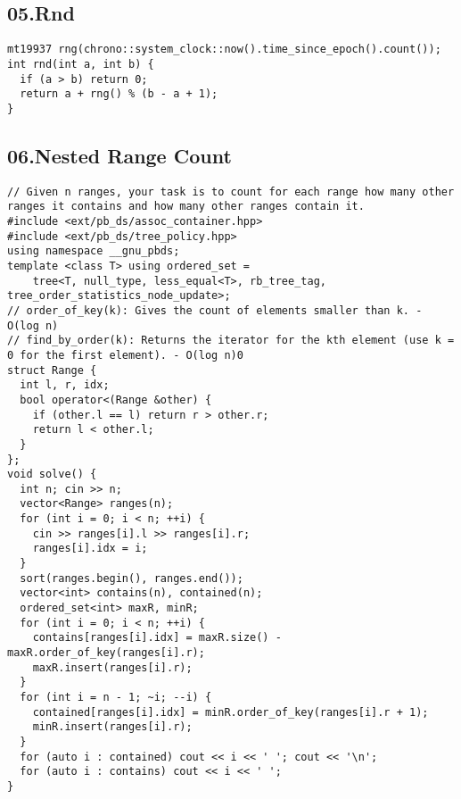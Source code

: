 \documentclass[twoside]{article}
\begin{document}
\begin{multicols*}{2}
{
\subsection*{05.Rnd}
}
\begin{verbatim}
mt19937 rng(chrono::system_clock::now().time_since_epoch().count());
int rnd(int a, int b) {
  if (a > b) return 0;
  return a + rng() % (b - a + 1);
}
\end{verbatim}

{
\subsection*{06.Nested Range Count}
}
\begin{verbatim}
// Given n ranges, your task is to count for each range how many other ranges it contains and how many other ranges contain it.
#include <ext/pb_ds/assoc_container.hpp>
#include <ext/pb_ds/tree_policy.hpp>
using namespace __gnu_pbds;
template <class T> using ordered_set =
    tree<T, null_type, less_equal<T>, rb_tree_tag, tree_order_statistics_node_update>;
// order_of_key(k): Gives the count of elements smaller than k. - O(log n)
// find_by_order(k): Returns the iterator for the kth element (use k = 0 for the first element). - O(log n)0
struct Range {
  int l, r, idx;
  bool operator<(Range &other) {
    if (other.l == l) return r > other.r;
    return l < other.l;
  }
};
void solve() {
  int n; cin >> n;
  vector<Range> ranges(n);
  for (int i = 0; i < n; ++i) {
    cin >> ranges[i].l >> ranges[i].r;
    ranges[i].idx = i;
  }
  sort(ranges.begin(), ranges.end());
  vector<int> contains(n), contained(n);
  ordered_set<int> maxR, minR;
  for (int i = 0; i < n; ++i) {
    contains[ranges[i].idx] = maxR.size() - maxR.order_of_key(ranges[i].r);
    maxR.insert(ranges[i].r);
  }
  for (int i = n - 1; ~i; --i) {
    contained[ranges[i].idx] = minR.order_of_key(ranges[i].r + 1);
    minR.insert(ranges[i].r);
  }
  for (auto i : contained) cout << i << ' '; cout << '\n';
  for (auto i : contains) cout << i << ' ';
}
\end{verbatim}


\end{multicols*}
\end{document}
